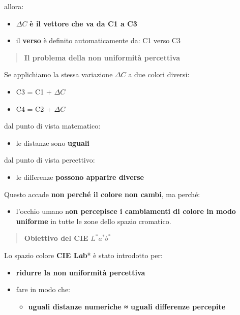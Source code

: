 \documentclass[
]{article}
\providecommand{\tightlist}{%
  \setlength{\itemsep}{0pt}\setlength{\parskip}{0pt}}
\begin{document}
allora:

\begin{itemize}
\tightlist
\item
  \(\Delta C\) \textbf{è il vettore che va da C1 a C3}
\item
  il \textbf{verso} è definito automaticamente da: C1 verso C3
\end{itemize}

\begin{quote}
\textbf{Il problema della non uniformità percettiva}
\end{quote}

Se applichiamo la stessa variazione \(\Delta C\) a due colori diversi:

\begin{itemize}
\tightlist
\item
  C3 = C1 + \(\Delta C\)
\item
  C4 = C2 + \(\Delta C\)
\end{itemize}

dal punto di vista matematico:

\begin{itemize}
\tightlist
\item
  le distanze sono \textbf{uguali}
\end{itemize}

dal punto di vista percettivo:

\begin{itemize}
\tightlist
\item
  le differenze \textbf{possono apparire diverse}
\end{itemize}

Questo accade \textbf{non perché il colore non cambi}, ma perché:

\begin{itemize}
\tightlist
\item
  l'occhio umano n\textbf{on percepisce i cambiamenti di colore in modo uniforme} in tutte le zone dello spazio cromatico.
\end{itemize}

\begin{quote}
\textbf{Obiettivo del CIE} \(L^* a^* b^*\)
\end{quote}

Lo spazio colore \textbf{CIE L\emph{a}b}* è stato introdotto per:

\begin{itemize}
\tightlist
\item
  \textbf{ridurre la non uniformità percettiva}
\item
  fare in modo che:

  \begin{itemize}
  \tightlist
  \item
    \textbf{uguali distanze numeriche ≈ uguali differenze percepite}
  \end{itemize}
\end{itemize}
\end{document}
